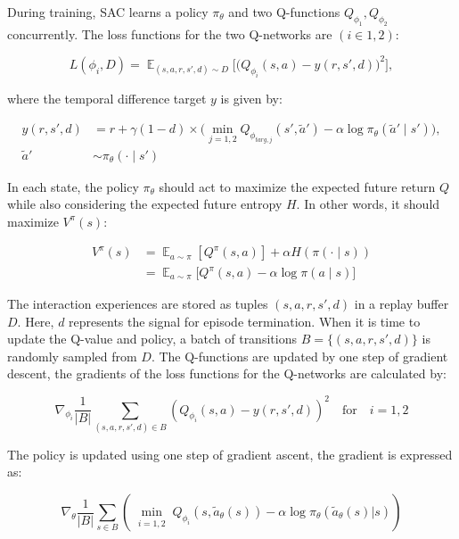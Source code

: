 During training, SAC learns a policy $\pi_{\theta}$ and two Q-functions
$Q_{\phi_1} , Q_{\phi_2}$ concurrently. The loss functions for the two Q-networks are
$(i \in {1, 2})$:

\begin{equation}
  L(\phi_i,D) = \displaystyle
  \mathop{\mathbb{E}}_{(s,a,r,s',d)\sim{D}}\bigg[\bigg(Q_{\phi_i}(s,a)-y(r,s',d)\bigg)^2\bigg],
\end{equation}

where the temporal difference target \(y\) is given by:

\begin{align}
  y(r,s',d) &= r + \gamma(1-d) \times \nonumber\bigg(\displaystyle
  \mathop{\min}_{j=1,2}Q_{\phi_{targ,j}}(s',\tilde{a}')-\alpha\log
  {\pi_\theta}(\tilde{a}'\mid{s}')\bigg), \\
  \tilde{a}'&\sim{\pi_\theta}(\cdot\mid{s'})
\end{align}

In each state, the policy \(\pi_\theta\) should act to maximize the expected
future return \(Q\) while also considering the expected future entropy \(H\). In other
words, it should maximize \(V^\pi(s)\):

\begin{align}
 V^\pi(s) &= {\displaystyle \mathop{\mathbb{E}}_{a\sim\pi}[Q^\pi(s,a)]} +
 \alpha{H(\pi(\cdot\mid{s}))} \\
 &= {\displaystyle \mathop{\mathbb{E}}_{a\sim\pi}[Q^\pi(s,a)} -
 \alpha{\log {\pi(a\mid{s})]}}
\end{align}

The interaction experiences are stored as tuples \((s, a, r, s', d)\) in a replay buffer \(\textit{D}\). Here, \(d\) represents the signal for episode termination. When it is time to update the Q-value and policy, a batch of transitions \(\textit{B} = \{(s, a, r, s', d)\}\) is randomly sampled from \(\textit{D}\). The Q-functions are updated by one step of gradient descent, the gradients of the loss functions for the Q-networks are calculated by:

\begin{equation}
\nabla_{\phi_i} \frac{1}{|\textit{B}|} \sum_{(s, a, r, s', d) \in \textit{B}} \left(Q_{\phi_i}(s, a) - y(r, s', d)\right)^2 \quad \text{for} \quad i=1,2
\end{equation}

The policy is updated using one step of gradient ascent, the gradient is expressed as:

\begin{equation}
\nabla_{\theta} \frac{1}{|\textit{B}|} \sum_{s \in \textit{B}}\left(\min\limits_{\substack{i=1,2}}Q_{\phi_i}(s,\widetilde{a}_{\theta}(s)) - \alpha \log\pi_{\theta}(\widetilde{a}_{\theta}(s)|s)\right)
\end{equation}

